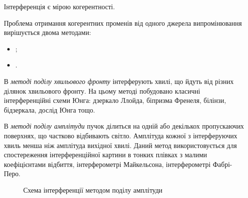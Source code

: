 \begin{Attention}\itshape
\medskip

Інтерференція є мірою когерентності.

\medskip
\end{Attention}


Проблема отримання когерентних променів від одного джерела випромінювання вирішується двома методами:
\begin{itemize}
	\item {};
	\item {}.
\end{itemize}

В \emph{методі поділу хвильового фронту} інтерферують хвилі, що йдуть від різних ділянок хвильового фронту. На цьому методі побудовано класичні інтерференційні схеми Юнга: дзеркало Ллойда, біпризма Френеля, білінзи, бідзеркала, дослід Юнга тощо.


В \emph{методі поділу амплітуди} пучок ділиться на одній або декількох пропускаючих поверхнях, що частково відбивають світло. Амплітуда кожної з інтерферуючих хвиль менша ніж амплітуда вихідної хвилі. Даний метод використовується для спостереження інтерференційної картини в тонких плівках з малими коефіцієнтами відбиття, інтерферометрі Майкельсона, інтерферометрі Фабрі-Перо.

\begin{figure}[h!]%
	\centering
	\caption{Схема інтерференції методом поділу амплітуди}
	\label{fig:imagesources}
\end{figure}







